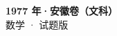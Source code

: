 \documentclass[zihao=-4, a4paper]{ctexart}
\begin{document}
\begin{center}
  {\Large\bfseries 1977 年·安徽卷（文科）}\\[4pt]
  {\large 数学 · 试题版}
\end{center}
\medskip
{}

\end{document}
